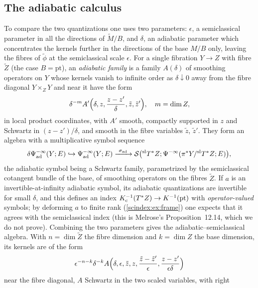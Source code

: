 \subsection{The adiabatic calculus}
To compare the two quantizations one uses two parameters: $\epsilon$, a
semiclassical parameter in all the directions of $\tilde M/B$, and $\delta$, an
adiabatic parameter which concentrates the kernels further in the directions of
the base $M/B$ only, leaving the fibres of $\tilde\phi$ at the semiclassical scale
$\epsilon$. For a single fibration
$Y\to Z$ with fibre $\tilde Z$ (the case $B=\mathrm{pt}$), an \emph{adiabatic
family} is a family $A(\delta)$ of smoothing operators on $Y$ whose kernels vanish
to infinite order as $\delta\downarrow0$ away from the fibre diagonal
$Y\times_ZY$ and near it have the form
\begin{equation*}
  \delta^{-m}A'\Bigl(\delta,z,\frac{z-z'}\delta,\tilde z,\tilde z'\Bigr),\quad
  m=\dim Z,
\end{equation*}
in local product coordinates, with $A'$ smooth, compactly supported in $z$ and
Schwartz in $(z-z')/\delta$, and smooth in the fibre variables $\tilde z$,
$\tilde z'$. They form an algebra with a multiplicative symbol sequence
\begin{equation*}
  \delta\Psi^{-\infty}_{\mathrm{ad}}(Y;E)\hookrightarrow\Psi^{-\infty}_{\mathrm{ad}}
  (Y;E)\xrightarrow{\ \sigma_{\mathrm{ad}}\ }\cS\bigl({}^{\mathrm{sl}}T^*Z;
  \Psido{-\infty}(\pi^*Y/{}^{\mathrm{sl}}T^*Z;E)\bigr),
\end{equation*}
the adiabatic symbol being a Schwartz family, parametrized by the semiclassical
cotangent bundle of the base, of smoothing operators on the fibres $\tilde Z$.
If $a$ is an invertible-at-infinity adiabatic symbol, its adiabatic
quantizations are invertible for small $\delta$, and this defines an index
$K_{\mathrm{c}}^{-1}(T^*Z)\to K^{-1}(\mathrm{pt})$ with \emph{operator-valued} symbols; by
deforming $a$ to finite rank (\cref{scindex:ex:frame}) one expects that it
agrees with the semiclassical index (this is Melrose's Proposition~12.14, which we
do not prove). Combining the two parameters gives the adiabatic--semiclassical
algebra. With $n=\dim\tilde Z$ the fibre dimension and $k=\dim Z$ the base
dimension, its kernels are of the form
\begin{equation*}
  \epsilon^{-n-k}\delta^{-k}A\Bigl(\delta,\epsilon,\tilde z,z,
  \frac{\tilde z-\tilde z'}{\epsilon},\frac{z-z'}{\epsilon\delta}\Bigr)
\end{equation*}
near the fibre diagonal, $A$ Schwartz in the two scaled variables, with right
